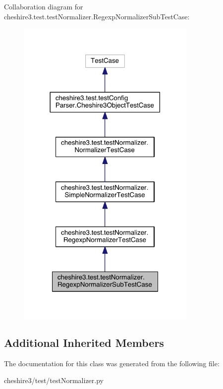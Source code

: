 Collaboration diagram for cheshire3.\-test.\-test\-Normalizer.\-Regexp\-Normalizer\-Sub\-Test\-Case\-:
\nopagebreak
\begin{figure}[H]
\begin{center}
\leavevmode
\includegraphics[width=246pt]{classcheshire3_1_1test_1_1test_normalizer_1_1_regexp_normalizer_sub_test_case__coll__graph}
\end{center}
\end{figure}
\subsection*{Additional Inherited Members}


The documentation for this class was generated from the following file\-:\begin{DoxyCompactItemize}
\item 
cheshire3/test/test\-Normalizer.\-py\end{DoxyCompactItemize}
